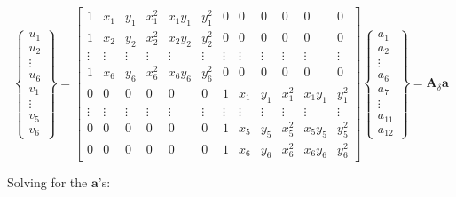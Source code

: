 \begin{equation}
\left\lbrace \begin{array}{c}
u_1 \\
u_2 \\
\vdots \\
u_6 \\
v_1 \\
\vdots \\
v_5 \\
v_6 \end{array} \right\rbrace = \begin{bmatrix}
1 & x_1 & y_1 & x_1^2 & x_1 y_1 & y_1^2 & 0 & 0 & 0 & 0 & 0 & 0 \\ 
1 & x_2 & y_2 & x_2^2 & x_2 y_2 & y_2^2 & 0 & 0 & 0 & 0 & 0 & 0 \\ 
\vdots & \vdots & \vdots & \vdots & \vdots & \vdots & \vdots & \vdots & \vdots & \vdots & \vdots & \vdots \\ 
1 & x_6 & y_6 & x_6^2 & x_6 y_6 & y_6^2 & 0 & 0 & 0 & 0 & 0 & 0 \\ 
0 & 0 & 0 & 0 & 0 & 0 & 1 & x_1 & y_1 & x_1^2 & x_1 y_1 & y_1^2 \\ 
\vdots & \vdots & \vdots & \vdots & \vdots & \vdots & \vdots & \vdots & \vdots & \vdots & \vdots & \vdots \\ 
0 & 0 & 0 & 0 & 0 & 0 & 1 & x_5 & y_5 & x_5^2 & x_5 y_5 & y_5^2 \\ 
0 & 0 & 0 & 0 & 0 & 0 & 1 & x_6 & y_6 & x_6^2 & x_6 y_6 & y_6^2
\end{bmatrix} \left\lbrace \begin{array}{c}
a_1 \\
a_2 \\
\vdots \\
a_6 \\
a_7 \\
\vdots \\
a_{11} \\
a_{12}
\end{array} \right\rbrace = \mathbf{A}_\delta \mathbf{a}
\end{equation}

Solving for the $ \mathbf{a} $'s:

